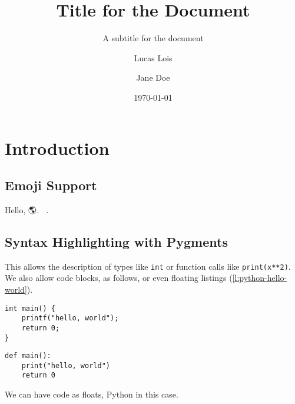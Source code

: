 \documentclass[12pt]{report}
\title{Title for the Document}
\subtitle{A subtitle for the document}
\institute{Universidad Católica del Uruguay}
\author{
	Lucas Lois \and
	Jane Doe
}
\date{\today}
\begin{document}

\tableofcontents
\chapter{Introduction}

\blindtext \parencite{coulouris}

\section{Emoji Support 🙌}

Hello, 🌎. 🚀🌝.

\section{Syntax Highlighting with Pygments}

This allows the description of types like \texttt{int} or function calls
like \texttt{print(x**2)}.
We also allow code blocks, as follows, or even floating listings
(\ref{l:python-hello-world}).

\begin{verbatim}
int main() {
    printf("hello, world");
    return 0;
}
\end{verbatim}

\blindtext

\begin{listing}
\begin{verbatim}
def main():
    print("hello, world")
    return 0
\end{verbatim}
\caption{We can have code as floats, Python in this case.}
\label{l:python-hello-world}
\end{listing}


\pagebreak
\printbibliography{}
\end{document}
